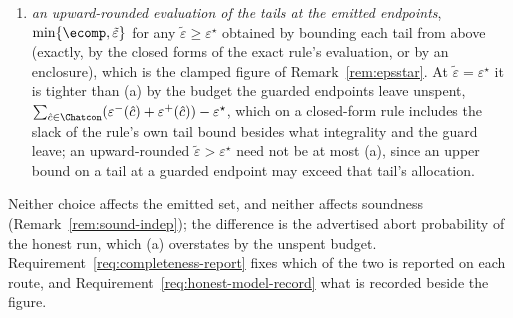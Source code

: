 \begin{remark}
\begin{enumerate}[label=(\alph*),leftmargin=2.2em]
and it lies in $[0,\ecomp]$ because the allocation of an
 is non-negative and sums to at most $\ecomp$
(Definition~\ref{def:endpoint-rule}), so no clamp is needed. It costs nothing
beyond the inputs and is what a rule that evaluates no tail can always
report;
\item \emph{an upward-rounded evaluation of the tails at the emitted
endpoints}, $\min\{\ecomp,\tilde\varepsilon\}$ for any
$\tilde\varepsilon\ge\varepsilon^{\star}$ obtained by bounding each tail from
above (exactly, by the closed forms of the exact rule's evaluation, or by an
enclosure), which is the clamped figure of Remark~\ref{rem:epsstar}. At
$\tilde\varepsilon=\varepsilon^{\star}$ it is tighter than (a) by the budget
the guarded endpoints leave unspent,
$\sum_{\hat c\in\Chatcon}(\varepsilon^{-}(\hat c)+\varepsilon^{+}(\hat c))-\varepsilon^{\star}$,
which on a closed-form rule includes the slack of the rule's own tail bound
besides what integrality and the guard leave; an
upward-rounded $\tilde\varepsilon>\varepsilon^{\star}$ need not be at most
(a), since an upper bound on a tail at a guarded endpoint may exceed that
tail's allocation.
\end{enumerate}
Neither choice affects the emitted set, and neither affects soundness
(Remark~\ref{rem:sound-indep}); the difference is the advertised abort
probability of the honest run, which (a) overstates by the unspent budget.
Requirement~\ref{req:completeness-report} fixes which of the two is reported
on each route, and Requirement~\ref{req:honest-model-record} what is recorded
beside the figure.
\end{remark}
